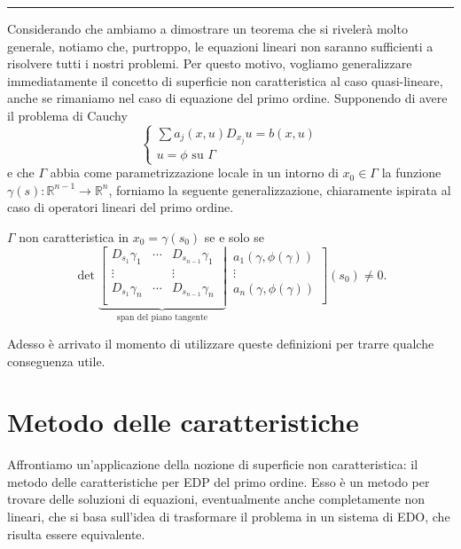 \noindent\rule[0.5ex]{\linewidth}{0.2pt}
Considerando che ambiamo a dimostrare un teorema che si rivelerà molto generale, notiamo che, purtroppo, le equazioni lineari non saranno sufficienti a risolvere tutti i nostri problemi. Per questo motivo, vogliamo generalizzare immediatamente il concetto di superficie non caratteristica al caso quasi-lineare, anche se rimaniamo nel caso di equazione del primo ordine. Supponendo di avere il problema di Cauchy
\begin{equation}
\begin{cases}
\sum a_j(x,u)D_{x_j} u = b(x,u)\\
u = \phi \text{ su } \Gamma
\end{cases}
\end{equation}
e che $\Gamma$ abbia come parametrizzazione locale in un intorno di $x_0\in \Gamma$ la funzione $\gamma (s): \mathbb{R}^{n-1}\rightarrow \mathbb{R}^n$, forniamo la seguente generalizzazione, chiaramente ispirata al caso di operatori lineari del primo ordine.
\begin{definition}
$\Gamma$ non caratteristica in $x_0=\gamma (s_0)$ se e solo se\\
\begin{equation*}
\det
\underbrace{
\left[
\begin{matrix}
D_{s_1}\gamma_1 & \cdots & D_{s_{n-1}}\gamma_1 \\
\vdots &  & \vdots \\
D_{s_1}\gamma_n & \cdots & D_{s_{n-1}}\gamma_n \\
\end{matrix}\;\right|}_{\text{span del piano tangente}} \,
\left.
\begin{matrix}
a_1(\gamma, \phi(\gamma))\\
\vdots\\
a_n(\gamma, \phi(\gamma))\\
\end{matrix}\right] (s_0) \neq 0.
\end{equation*}
\end{definition}
Adesso è arrivato il momento di utilizzare queste definizioni per trarre qualche conseguenza utile.

\newpage
\section{Metodo delle caratteristiche}\label{metodocar}
Affrontiamo un'applicazione della nozione di superficie non caratteristica: il metodo delle caratteristiche per EDP del primo ordine. 
Esso è un metodo per trovare delle soluzioni di equazioni, eventualmente anche completamente non lineari, che si basa sull'idea di trasformare il problema in un sistema di EDO, che risulta essere equivalente. 

